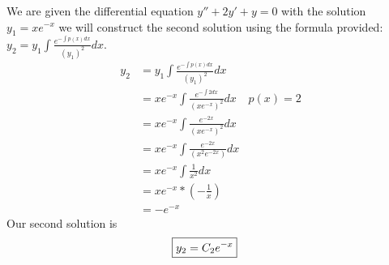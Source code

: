 \documentclass{article}
\begin{document}
\pagestyle{fancy}

\setcounter{section}{4}
\setcounter{subsection}{2}
\setcounter{subsubsection}{0}

\subsubsection{} 
 We are given the differential equation $ y'' + 2y' + y = 0$ with the solution $y_1 = xe^{-x}$ we will construct the second solution using the formula provided: $y_2 = y_1\int \frac{e^{- \int p(x)dx}}{(y_1)^2}dx$.
\begin{align}
    y_2 &= y_1\int \frac{e^{- \int p(x)dx}}{(y_1)^2}dx \\ 
    &  = xe^{-x}\int \frac{e^{- \int 2dx}}{(xe^{-x})^2}dx & p(x) = 2  \\
    & = xe^{-x}\int \frac{e^{-2x}}{(xe^{-x})^2}dx \\
    & = xe^{-x}\int \frac{e^{-2x}}{(x^2e^{-2x})}dx \\
    & = xe^{-x}\int \frac{1}{x^2}dx \\
    & = xe^{-x} * (- \frac{1}{x}) \\
    & = -e^{-x}
\end{align}
Our second solution is 
\begin{align*}
    \Aboxed{y_2 = C_2 e^{-x}}
\end{align*}
\subsubsection{}
\end{document}
